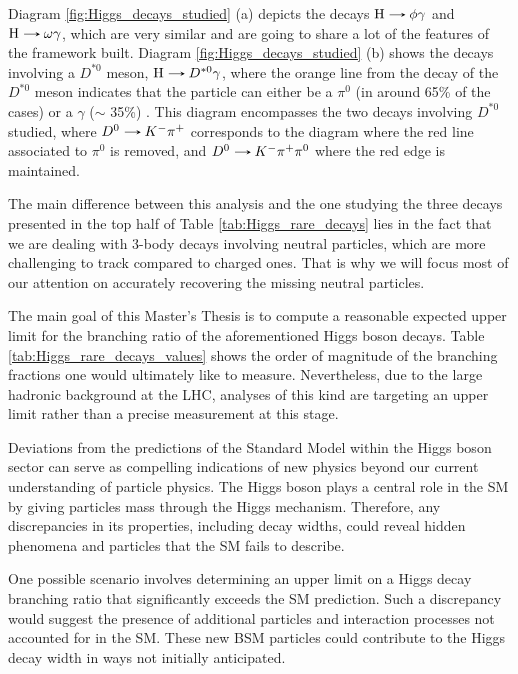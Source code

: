 Diagram \ref{fig:Higgs_decays_studied} (a) depicts the decays $\text{H}\decaysto \phi\gamma$ and $\text{H}\decaysto \omega\gamma$, which are very similar and are going to share a lot of the features of the framework built. Diagram \ref{fig:Higgs_decays_studied} (b) shows the decays involving a $D^{*0}$ meson, $\text{H}\decaysto D^{*0}\gamma$, where the orange line from the decay of the $D^{*0}$ meson indicates that the particle can either be a $\pi^{0}$ (in around 65\% of the cases) or a $\gamma$ ($\sim$ 35\%) \cite{PDG}. This diagram encompasses the two decays involving $D^{*0}$ studied, where $D^{0}\decaysto K^{-}\pi^{+}$ corresponds to the diagram where the red line associated to $\pi^{0}$ is removed, and $D^{0}\decaysto K^{-}\pi^{+}\pi^{0}$ where the red edge is maintained.

The main difference between this analysis and the one studying the three decays presented in the top half of Table \ref{tab:Higgs_rare_decays} lies in the fact that we are dealing with 3-body decays involving neutral particles, which are more challenging to track compared to charged ones. That is why we will focus most of our attention on accurately recovering the missing neutral particles.

The main goal of this Master's Thesis is to compute a reasonable expected upper limit for the branching ratio of the aforementioned Higgs boson decays. Table \ref{tab:Higgs_rare_decays_values} shows the order of magnitude of the branching fractions one would ultimately like to measure. Nevertheless, due to the large hadronic background at the LHC, analyses of this kind are targeting an upper limit rather than a precise measurement at this stage.

Deviations from the predictions of the Standard Model within the Higgs boson sector can serve as compelling indications of new physics beyond our current understanding of particle physics. The Higgs boson plays a central role in the SM by giving particles mass through the Higgs mechanism. Therefore, any discrepancies in its properties, including decay widths, could reveal hidden phenomena and particles that the SM fails to describe.

One possible scenario involves determining an upper limit on a Higgs decay branching ratio that significantly exceeds the SM prediction. Such a discrepancy would suggest the presence of additional particles and interaction processes not accounted for in the SM. These new BSM particles could contribute to the Higgs decay width in ways not initially anticipated.

